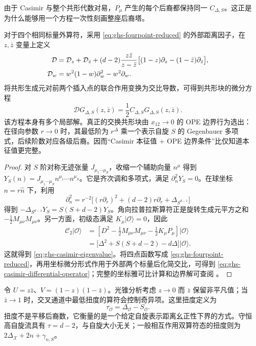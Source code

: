 由于 Casimir 与整个共形代数对易，$P_\mu$ 产生的每个后裔都保持同一 $C_{\Delta,S}$。这正是为什么能够用一个方程一次性刻画整座后裔塔。

对于四个相同标量外算符，采用 \cref{eq:ghs-fourpoint-reduced} 的外部距离因子，在 $z,\bar z$ 变量上定义
\begin{align}\label{eq:ghs-casimir-differential-operator}
 \mathcal D&=\mathcal D_z+\mathcal D_{\bar z}
 +(d-2)\frac{z\bar z}{z-\bar z}
 \bigl[(1-z)\partial_z-(1-\bar z)\partial_{\bar z}\bigr],\\
 \mathcal D_w&=w^2(1-w)\partial_w^2-w^2\partial_w.
 \notag
\end{align}
将共形生成元对前两个插入点的联合作用变换为交比导数，可得到共形块的微分方程
\begin{equation}\label{eq:ghs-casimir-block-equation}
 \mathcal D G_{\Delta,S}(z,\bar z)
 =\frac12 C_{\Delta,S}G_{\Delta,S}(z,\bar z).
\end{equation}
该方程本身有多个局部解。真正的交换共形块由 $x_{12}\to0$ 的 OPE 边界行为选出：在径向参数 $r\to0$ 时，其最低阶为 $r^\Delta$ 乘一个表示自旋 $S$ 的 Gegenbauer 多项式，后续阶数对应各级后裔。因而“Casimir 本征值 + OPE 边界条件”比仅知道本征值更完整。


\begin{proof}
对 $S$ 阶对称无迹张量 $J_{\mu_1\cdots\mu_S}$，收缩一个辅助向量 $n^\mu$ 得到 $Y_S(n)=J_{\mu_1\cdots\mu_S}n^{\mu_1}\cdots n^{\mu_S}$。它是齐次调和多项式，满足 $\partial_n^2Y_S=0$。在球坐标 $n=r\widehat n$ 下，利用
\begin{equation*}
\partial_n^2=r^{-2}\bigl[(r\partial_r)^2
+(d-2)r\partial_r+\Delta_{S^{d-1}}\bigr]
\end{equation*}
得到 $-\Delta_{S^{d-1}}Y_S=S(S+d-2)Y_S$。角向拉普拉斯算符正是旋转生成元平方之和 $-\tfrac12 M_{\mu\nu}M_{\mu\nu}$。另一方面，初级态满足 $K_\mu|\mathcal O\rangle=0$，因此
\begin{align*}
\mathcal C_2|\mathcal O\rangle
&=\left[D^2-\frac12M_{\mu\nu}M_{\mu\nu}
-\frac12K_\mu P_\mu\right]|\mathcal O\rangle\\
&=\bigl[\Delta^2+S(S+d-2)-d\Delta\bigr]|\mathcal O\rangle.
\end{align*}
这就得到 \cref{eq:ghs-casimir-eigenvalue}。将四点函数写成 \cref{eq:ghs-fourpoint-reduced}，再用坐标微分形式作用于外部两个标量后化简交比，可得到 \cref{eq:ghs-casimir-differential-operator}；完整的坐标雅可比计算和边界解可查阅 \cite{ghs-simmons,ghs-hogervorst}。
\end{proof}

令 $U=z\bar z$、$V=(1-z)(1-\bar z)$。光锥分析考虑 $z\to0$ 而 $\bar z$ 保留非平凡值；当 $\bar z\to1$ 时，交叉通道中最低扭度的算符会控制奇异项。这里扭度定义为
\begin{equation}\label{eq:ghs-twist-definition}
 \tau_{\mathcal O}=\Delta_{\mathcal O}-S_{\mathcal O}.
\end{equation}
扭度不是平移后裔数，它衡量的是一个给定自旋表示距离幺正性下界的方式。守恒高自旋流具有 $\tau=d-2$，与自旋大小无关；一般相互作用双算符态的扭度则为 $2\Delta_\mathcal X+2n+\gamma_{n,S}$。

